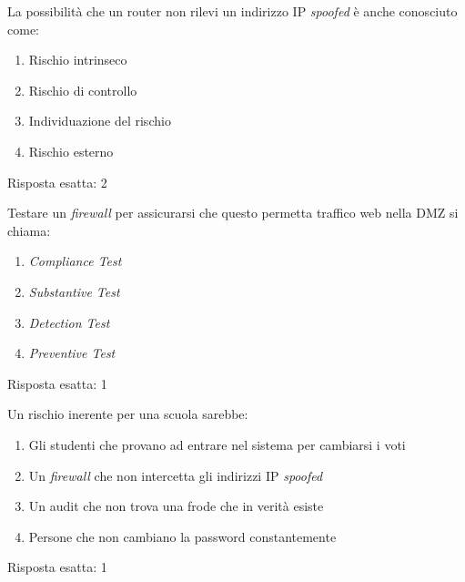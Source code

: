 \begin{Exercise} [
  title={Quiz},
  label={audit8}
  ]

  \Question La possibilità che un router non rilevi un indirizzo IP 
\textit{spoofed} è anche conosciuto come:
\begin{enumerate}
 \item Rischio intrinseco
 \item Rischio di controllo
 \item Individuazione del rischio
 \item Rischio esterno
\end{enumerate}  

\end{Exercise}


\begin{Answer} [
  ref={audit8},
  number={8}
  ]

  \Question Risposta esatta: 2

\end{Answer}

\begin{Exercise} [
  title={Quiz},
  label={audit9}
  ]

  \Question Testare un \textit{firewall} per assicurarsi che questo permetta 
traffico web nella DMZ si chiama:
\begin{enumerate}
 \item \textit{Compliance Test}
 \item \textit{Substantive Test}
 \item \textit{Detection Test}
 \item \textit{Preventive Test}
\end{enumerate}
\end{Exercise}


\begin{Answer} [
  ref={audit9},
  number={9}
  ]

  \Question Risposta esatta: 1

\end{Answer}

\begin{Exercise} [
  title={Quiz},
  label={audit10}
  ]

  \Question Un rischio inerente per una scuola sarebbe:
\begin{enumerate}
 \item Gli studenti che provano ad entrare nel sistema per cambiarsi i voti
 \item Un \textit{firewall} che non intercetta gli indirizzi IP \textit{spoofed}
 \item Un audit che non trova una frode che in verità esiste
 \item Persone che non cambiano la password constantemente
\end{enumerate}
  
\end{Exercise}


\begin{Answer} [
  ref={audit10},
  number={10}
  ]

  \Question Risposta esatta: 1

\end{Answer}

